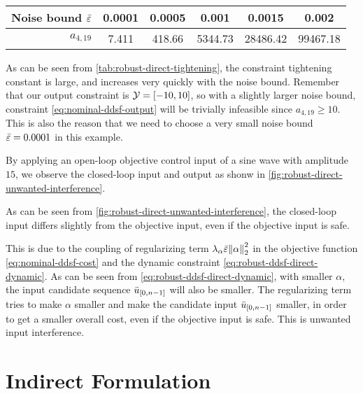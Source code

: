 {\renewcommand{\arraystretch}{1.3}%
\begin{center}
\begin{tabular}{ r|c|c|c|c|c }
    Noise bound $\bar{\varepsilon}$ & 0.0001 & 0.0005 & 0.001 & 0.0015 & 0.002 \\
    \hline
    $a_{4, 19}$ & 7.411 & 418.66 & 5344.73 & 28486.42 & 99467.18 \\
\end{tabular}
\end{center}
}

As can be seen from \cref{tab:robust-direct-tightening}, the constraint tightening constant is large, and increases very quickly with the noise bound.
Remember that our output constraint is $\mathcal{Y} = \left[-10, 10\right]$, so with a slightly larger noise bound, constraint \cref{eq:nominal-ddsf-output} will be trivially infeasible since $a_{4, 19} \geq 10$.
This is also the reason that we need to choose a very small noise bound $\bar{\varepsilon} = 0.0001$ in this example.

By applying an open-loop objective control input of a sine wave with amplitude $15$, we observe the closed-loop input and output as shonw in \cref{fig:robust-direct-unwanted-interference}.


As can be seen from \cref{fig:robust-direct-unwanted-interference}, the closed-loop input differs slightly from the objective input, even if the objective input is safe.

This is due to the coupling of regularizing term $\lambda_\alpha \bar{\varepsilon} \norm{\alpha}_2^2$ in the objective function \cref{eq:nominal-ddsf-cost} and the dynamic constraint \cref{eq:robust-ddsf-direct-dynamic}.
As can be seen from \cref{eq:robust-ddsf-direct-dynamic}, with smaller $\alpha$, the input candidate sequence $\bar{u}_{\left[ 0, n-1 \right]}$ will also be smaller.
The regularizing term tries to make $\alpha$ smaller and make the candidate input $\bar{u}_{\left[ 0, n-1 \right]}$ smaller, in order to get a smaller overall cost, even if the objective input is safe.
This is unwanted input interference.


\section{Indirect Formulation}\label{sec:indirect-formulation}

